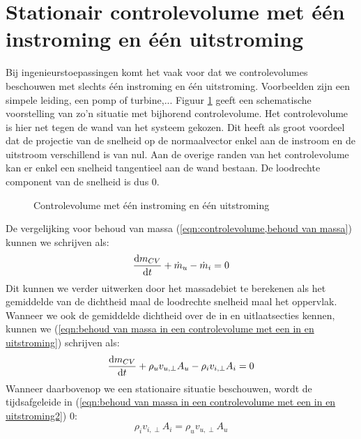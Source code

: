 	\section{Stationair controlevolume met \'e\'en instroming en \'e\'en uitstroming}	
Bij ingenieurstoepassingen komt het vaak voor dat we controlevolumes beschouwen met slechts \'e\'en instroming en \'e\'en uitstroming. Voorbeelden zijn een simpele leiding, een pomp of turbine,... 
Figuur \ref{fig:controlevolume een in en uitstroming} geeft een schematische voorstelling van zo'n situatie met bijhorend controlevolume. Het controlevolume is hier net tegen de wand van het systeem gekozen. Dit heeft als groot voordeel dat de projectie van de snelheid op de normaalvector enkel aan de instroom en de uitstroom verschillend is van nul. Aan de overige randen van het controlevolume kan er enkel een snelheid tangentieel aan de wand bestaan. De loodrechte component van de snelheid is dus $0$.
\begin{figure}[htb]
	\centering
	
	\caption{Controlevolume met \'e\'en instroming en \'e\'en uitstroming}
	\label{fig:controlevolume een in en uitstroming}
\end{figure}
De vergelijking voor behoud van massa (\ref{eqn:controlevolume,behoud van massa}) kunnen we schrijven als:
\begin{equation}
	\dfrac{\mathrm{d} m_{CV}}{\mathrm{d} t} + \dot{m}_{u} - \dot{m}_{i} = 0
	\label{eqn:behoud van massa in een controlevolume met een in en uitstroming}
\end{equation}
Dit kunnen we verder uitwerken door het massadebiet te berekenen als  het gemiddelde van de dichtheid maal de loodrechte snelheid maal het oppervlak. Wanneer we ook de gemiddelde dichtheid over de in en uitlaatsecties kennen, kunnen we (\ref{eqn:behoud van massa in een controlevolume met een in en uitstroming}) schrijven als:
\begin{equation}
	\dfrac{\mathrm{d} m_{CV}}{\mathrm{d} t} + \rho_{u} v_{u,\perp} A_{u} - \rho_{i} v_{i,\perp} A_{i} = 0
	\label{eqn:behoud van massa in een controlevolume met een in en uitstroming2}
\end{equation}
Wanneer daarbovenop we een stationaire situatie beschouwen, wordt de tijdsafgeleide in (\ref{eqn:behoud van massa in een controlevolume met een in en uitstroming2}) $0$:
\begin{equation}
	\rho_i v_{i,\perp} A_i = \rho_u v_{u,\perp} A_u
	\label{eqn:behoud van massa in een stationair controlevolume met een in en uitstroming}
\end{equation}
